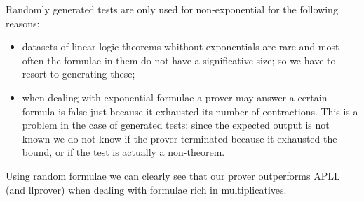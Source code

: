 Randomly generated tests are only used for non-exponential for the following reasons:
\begin{itemize}
	\item datasets of linear logic theorems whithout exponentials are rare and most often the formulae in them do not have a significative size; so we have to resort to generating these;
	\item when dealing with exponential formulae a prover may answer a certain formula is false just because it exhausted its number of contractions.
		This is a problem in the case of generated tests: since the expected output is not known we do not know if the prover terminated because it exhausted the bound, or if the test is actually a non-theorem.
\end{itemize}

Using random formulae we can clearly see that our prover outperforms APLL (and llprover) when dealing with formulae rich in multiplicatives.
